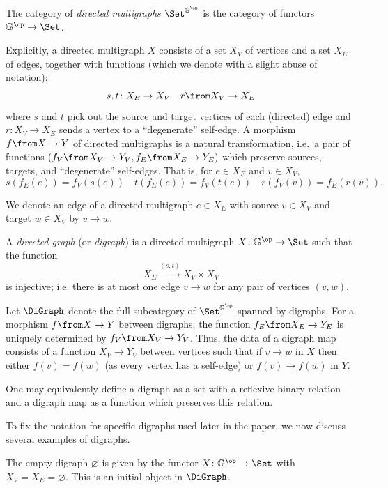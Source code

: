 \begin{defi}
    The category of \emph{directed multigraphs} $\Set^{\mathbb{G}^\op}$ is the category of functors $\mathbb{G}^\op \to \Set$.
\end{defi}
Explicitly, a directed multigraph $X$ consists of a set $X_V$ of vertices and a set $X_E$ of edges, together with functions (which we denote with a slight abuse of notation):
\[ s,t\colon X_E\to X_V \quad r \from X_V \to X_E \] 
where $s$ and $t$ pick out the source and target vertices of each (directed) edge and $r\colon X_V\to X_E$ sends a vertex to a ``degenerate'' self-edge.
A morphism $f \from X \to Y$ of directed multigraphs is a natural transformation, i.e.~a pair of functions $(f_V \from X_V \to Y_V, f_E \from X_E \to Y_E)$ which preserve sources, targets, and ``degenerate'' self-edges.
That is, for $e \in X_E$ and $v \in X_V$,
\[ s(f_E(e)) = f_V(s(e)) \quad t(f_E(e)) = f_V(t(e)) \quad r(f_V(v)) = f_E(r(v)).  \]

We denote an edge of a directed multigraph $e\in X_E$ with source $v \in X_V$ and target $w \in X_V$ by $v \to w$.
\begin{defi}
    A \emph{directed graph} (or \emph{digraph}) is a directed multigraph $X\colon\mathbb{G}^\op\to\Set$ such that the function $$X_E\xrightarrow{(s,t)} X_V\times X_V$$ is injective; i.e. there is at most one edge $v\to w$ for any pair of vertices $(v,w)$.
\end{defi}
Let $\DiGraph$ denote the full subcategory of $\Set^{\mathbb{G}^\op}$ spanned by digraphs.
For a morphism $f \from X \to Y$ between digraphs, the function $f_E \from X_E \to Y_E$ is uniquely determined by $f_V \from X_V \to Y_V$.
Thus, the data of a digraph map consists of a function $X_V \to Y_V$ between vertices such that if $v \to w$ in $X$ then either $f(v) = f(w)$ (as every vertex has a self-edge) or $f(v) \to f(w)$ in $Y$.

\begin{remark}
    One may equivalently define a digraph as a set with a reflexive binary relation and a digraph map as a function which preserves this relation.
\end{remark}



To fix the notation for specific digraphs used later in the paper, we now discuss several examples of digraphs.

\begin{example}
    The empty digraph $\varnothing$ is given by the functor $X\colon\mathbb{G}^\op\to\Set$ with $X_V=X_E=\varnothing$. This is an initial object in $\DiGraph$.  
\end{example}

